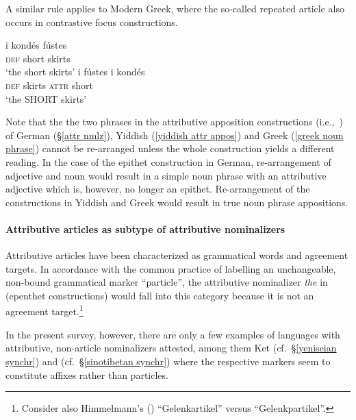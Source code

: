 A similar rule applies to Modern Greek, where the so-called repeated article also occurs in contrastive focus constructions. 
\begin{exe}
\ex
{} \label{greek noun phrase}
\begin{xlist}
\ex
\gll 	i kondés fústes\\
	\textsc{def} short skirts\\
\glt	‘the short skirts’
\ex 
\gll 	i fústes i kondés\\
	\textsc{def} skirts \textsc{attr} short\\
\glt	‘the SHORT skirts’
\end{xlist}
\end{exe}
Note that the the two phrases in the attributive apposition constructions (i.e.,~) of German (\S\ref{attr nmlz}), Yiddish (\ref{yiddish attr appos}) and Greek (\ref{greek noun phrase}) cannot be re-arranged unless the whole construction yields a different reading. In the case of the epithet construction in German, re-arrangement of adjective and noun would result in a simple noun phrase with an attributive adjective which is, however, no longer an epithet. Re-arrangement of the constructions in Yiddish and Greek would result in true noun phrase appositions.

\paragraph*{Attributive articles as subtype of attributive nominalizers}
Attributive articles have been characterized as grammatical words and agreement targets. In accordance with the common practice of labelling an unchangeable, non-bound grammatical marker “particle”, the attributive nominalizer \textit{the} in  (epen\-thet constructions) would fall into this category because it is not an agreement target.\footnote{Consider also Himmelmann's (\citeyear{himmelmann1997}) “Gelenkartikel” versus “Gelenkpartikel”.}

In the present survey, however, there are only a few examples of languages with attributive, non-article nominalizers attested, among them Ket (cf.~\S\ref{yeniseian synchr}) and  (cf.~\S\ref{sinotibetan synchr}) where the respective markers seem to constitute affixes rather than particles.

